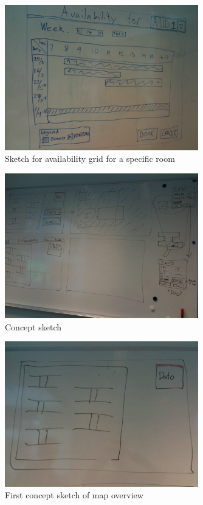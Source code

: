 \begin{figure}[htb]
\begin{center}
\leavevmode
\includegraphics[width=0.75\textwidth]{images/whiteboard3}
\end{center}
\caption{Sketch for availability grid for a specific room}
\label{fig:app_w3}
\end{figure}

\begin{figure}[htb]
\begin{center}
\leavevmode
\includegraphics[width=0.75\textwidth]{images/whiteboard4}
\end{center}
\caption{Concept sketch}
\label{fig:app_w4}
\end{figure}

\begin{figure}[htb]
\begin{center}
\leavevmode
\includegraphics[width=0.75\textwidth]{images/whiteboard5}
\end{center}
\caption{First concept sketch of map overview}
\label{fig:app_w5}
\end{figure}

